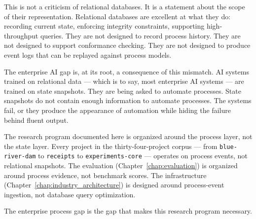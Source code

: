 This is not a criticism of relational databases. It is a statement about the scope of their representation. Relational databases are excellent at what they do: recording current state, enforcing integrity constraints, supporting high-throughput queries. They are not designed to record process history. They are not designed to support conformance checking. They are not designed to produce event logs that can be replayed against process models.

The enterprise AI gap is, at its root, a consequence of this mismatch. AI systems trained on relational data --- which is to say, most enterprise AI systems --- are trained on state snapshots. They are being asked to automate processes. State snapshots do not contain enough information to automate processes. The systems fail, or they produce the appearance of automation while hiding the failure behind fluent output.

The research program documented here is organized around the process layer, not the state layer. Every project in the thirty-four-project corpus --- from \texttt{blue-river-dam} to \texttt{receipts} to \texttt{experiments-core} --- operates on process events, not relational snapshots. The evaluation (Chapter~\ref{chap:evaluation}) is organized around process evidence, not benchmark scores. The infrastructure (Chapter~\ref{chap:industry_architecture}) is designed around process-event ingestion, not database query optimization.

The enterprise process gap is the gap that makes this research program necessary.

